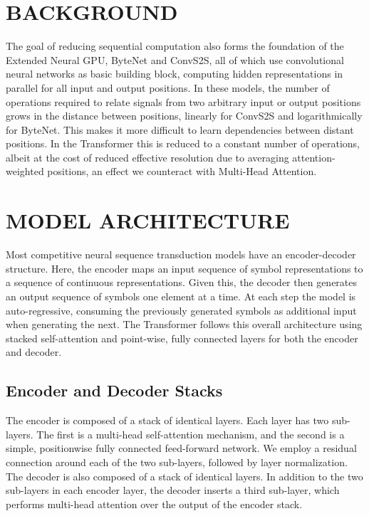 \documentclass[conference]{IEEEtran}
\begin{document}
\section{BACKGROUND}
The goal of reducing sequential computation also forms the foundation of the Extended Neural GPU, ByteNet and ConvS2S, all of which use convolutional neural networks as basic building block, computing hidden representations in parallel for all input and output positions. In these models, the number of operations required to relate signals from two arbitrary input or output positions grows in the distance between positions, linearly for ConvS2S and logarithmically for ByteNet. This makes it more difficult to learn dependencies between distant positions. In the Transformer this is reduced to a constant number of operations, albeit at the cost of reduced effective resolution due to averaging attention-weighted positions, an effect we counteract with Multi-Head Attention.

\section{MODEL ARCHITECTURE}
Most competitive neural sequence transduction models have an encoder-decoder structure. Here, the encoder maps an input sequence of symbol representations to a sequence of continuous representations. Given this, the decoder then generates an output sequence of symbols one element at a time. At each step the model is auto-regressive, consuming the previously generated symbols as additional input when generating the next. The Transformer follows this overall architecture using stacked self-attention and point-wise, fully connected layers for both the encoder and decoder.

\subsection{Encoder and Decoder Stacks}
The encoder is composed of a stack of identical layers. Each layer has two sub-layers. The first is a multi-head self-attention mechanism, and the second is a simple, positionwise fully connected feed-forward network. We employ a residual connection around each of the two sub-layers, followed by layer normalization. The decoder is also composed of a stack of identical layers. In addition to the two sub-layers in each encoder layer, the decoder inserts a third sub-layer, which performs multi-head attention over the output of the encoder stack.
\end{document}
